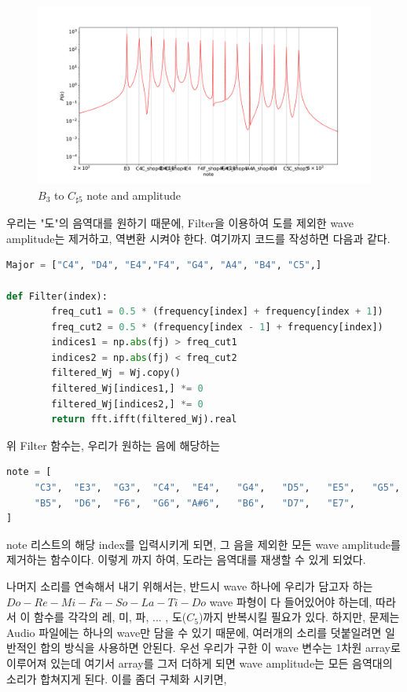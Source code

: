 \documentclass[11pt]{article}
\begin{document}
\begin{figure}[!ht]
  \centering
  \includegraphics[width=1\textwidth]{FFT_figure.pdf}
  \caption{$B_{3}$ to $C_{\sharp5}$  note and amplitude}
\end{figure}
우리는 "도"의 음역대를 원하기 때문에,  Filter을 이용하여 도를 제외한 wave amplitude는 제거하고, 역변환 시켜야 한다. 여기까지 코드를 작성하면 다음과 같다.
\begin{lstlisting}[language=Python]
Major = ["C4", "D4", "E4","F4", "G4", "A4", "B4", "C5",]

def Filter(index):
        freq_cut1 = 0.5 * (frequency[index] + frequency[index + 1])
        freq_cut2 = 0.5 * (frequency[index - 1] + frequency[index])
        indices1 = np.abs(fj) > freq_cut1
        indices2 = np.abs(fj) < freq_cut2
        filtered_Wj = Wj.copy()
        filtered_Wj[indices1,] *= 0
        filtered_Wj[indices2,] *= 0   
        return fft.ifft(filtered_Wj).real        
\end{lstlisting}
위 Filter 함수는, 우리가 원하는 음에 해당하는 

\begin{lstlisting}[language=Python]
note = [
     "C3",  "E3",  "G3",  "C4",  "E4",   "G4",   "D5",   "E5",   "G5",
     "B5",  "D6",  "F6",  "G6", "A#6",   "B6",   "D7",   "E7",
]
\end{lstlisting}
note 리스트의 해당 index를 입력시키게 되면, 그 음을 제외한 모든 wave amplitude를 제거하는 함수이다. 이렇게 까지 하여, 도라는 음역대를 재생할 수 있게 되었다.

나머지 소리를 연속해서 내기 위해서는, 반드시 wave 하나에 우리가 담고자 하는 $Do-Re-Mi-Fa-So-La-Ti-Do$ wave 파형이 다 들어있어야 하는데, 따라서 이 함수를 각각의 레, 미, 파, ... , 도($C_5$)까지 반복시킬 필요가 있다. 하지만, 문제는 Audio 파일에는 하나의 wave만 담을 수 있기 때문에, 여러개의 소리를 덧붙일려면 일반적인 합의 방식을 사용하면 안된다. 우선 우리가 구한 이 wave 변수는 1차원 array로 이루어져 있는데 여기서 array를 그저 더하게 되면 wave amplitude는 모든 음역대의 소리가 합쳐지게 된다. 이를 좀더 구체화 시키면,
\end{document}
